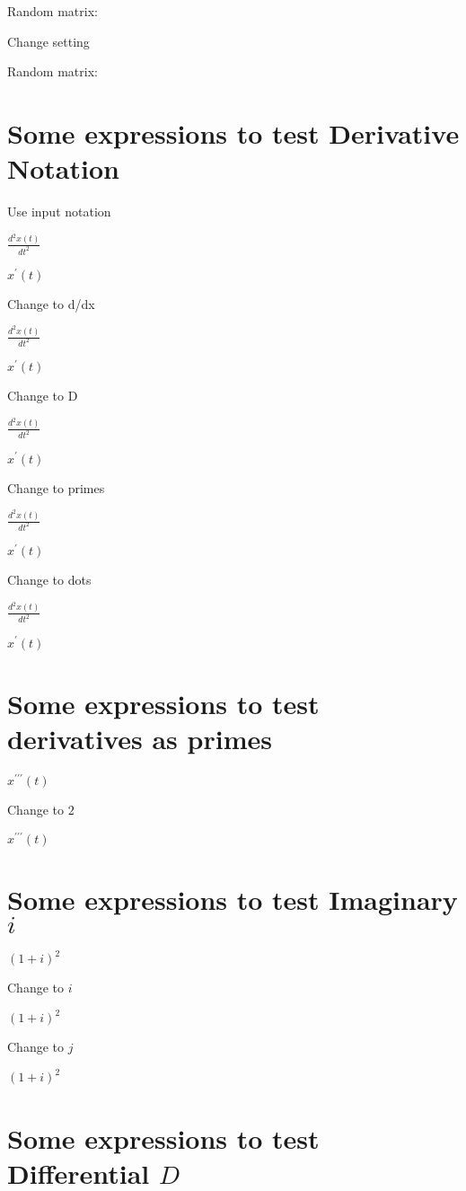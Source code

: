 \documentclass{article}
\begin{document}
Random matrix:

Change setting

Random matrix:

\noindent \hrulefill

\section{Some expressions to test Derivative Notation}

Use input notation

$\frac{d^{2}x\left( t\right) }{dt^{2}}$

$x^{\prime }(t)$

Change to d/dx

$\frac{d^{2}x\left( t\right) }{dt^{2}}$

$x^{\prime }(t)$

Change to D

$\frac{d^{2}x\left( t\right) }{dt^{2}}$

$x^{\prime }(t)$

Change to primes

$\frac{d^{2}x\left( t\right) }{dt^{2}}$

$x^{\prime }(t)$

Change to dots

$\frac{d^{2}x\left( t\right) }{dt^{2}}$

$x^{\prime }(t)$

\section{Some expressions to test derivatives as primes}

$x^{\prime \prime \prime }(t)$

Change to $2$

$x^{\prime \prime \prime }(t)$

\noindent \hrulefill

\section{Some expressions to test Imaginary $i$}

$\left( 1+i\right) ^{2}$

Change to $i$

$\left( 1+i\right) ^{2}$

Change to $j$

$\left( 1+i\right) ^{2}$

\section{Some expressions to test Differential $D$}
\end{document}

